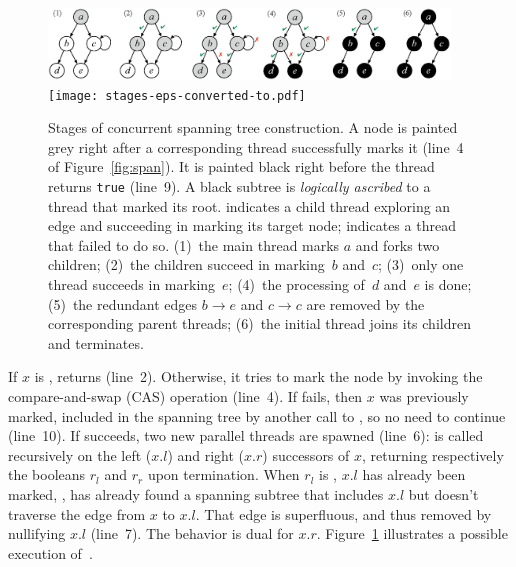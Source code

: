 {
\setlength{\belowcaptionskip}{-10pt} 
\begin{figure}[t]
\centering
\ifdefined\psflag
    \includegraphics[width=0.95\textwidth]{stages.eps}
\else
    \texttt{[image: stages-eps-converted-to.pdf]}
\fi
\caption{Stages of concurrent spanning tree construction. A node is
  painted grey right after a corresponding thread successfully marks
  it (line~4 of Figure~\ref{fig:span}). It is painted black right
  before the thread returns \texttt{true} (line~9). A black subtree is
  \emph{logically ascribed} to a thread that marked its
  root. \textcolor{OliveGreen}{\cmark} indicates a child thread
  exploring an edge and succeeding in marking its target node;
  \textcolor{red}{\xmark} indicates a thread that failed to do
  so. (1)~the main thread marks $a$ and forks two children; (2)~the
  children succeed in marking~$b$ and~$c$; (3)~only one thread
  succeeds in marking~$e$; (4)~the processing of~$d$ and~$e$ is done;
  (5)~the redundant edges $b \rightarrow e$ and $c \rightarrow c$ are
  removed by the corresponding parent threads; (6)~the initial thread joins
  its children and terminates.}
\label{fig:stages}
\end{figure}
}

If $x$ is ,  returns 
(line~2). Otherwise, it tries to mark the node by invoking the
compare-and-swap (CAS) operation (line~4). If  fails, then
$x$ was previously marked, \ie included in the spanning tree by
another call to , so no need to continue (line~10). If
 succeeds, two new parallel threads are spawned (line~6):
 is called recursively on the left ($x.l$) and right
($x.r$) successors of $x$, returning respectively the booleans $r_l$
and $r_r$ upon termination. When $r_l$ is , $x.l$ has
already been marked, \ie,  has already found a spanning
subtree that includes $x.l$ but doesn't traverse the edge from $x$ to
$x.l$. That edge is superfluous, and thus removed by nullifying $x.l$
(line~7). The behavior is dual for $x.r$. Figure~\ref{fig:stages}
illustrates a possible execution of~.

